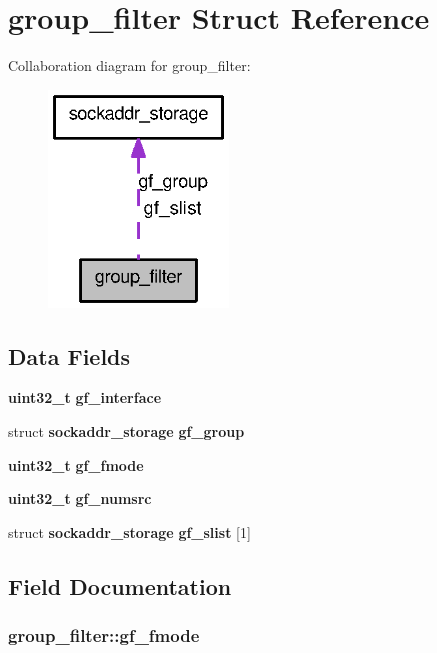 \section{group\_\-filter Struct Reference}
\label{structgroup__filter}


Collaboration diagram for group\_\-filter:
\nopagebreak
\begin{figure}[H]
\begin{center}
\leavevmode
\includegraphics[width=136pt]{structgroup__filter__coll__graph}
\end{center}
\end{figure}
\subsection*{Data Fields}
\begin{DoxyCompactItemize}
\item 
{\bf uint32\_\-t} {\bf gf\_\-interface}
\item 
struct {\bf sockaddr\_\-storage} {\bf gf\_\-group}
\item 
{\bf uint32\_\-t} {\bf gf\_\-fmode}
\item 
{\bf uint32\_\-t} {\bf gf\_\-numsrc}
\item 
struct {\bf sockaddr\_\-storage} {\bf gf\_\-slist} [1]
\end{DoxyCompactItemize}


\subsection{Field Documentation}
\subsubsection[{gf\_\-fmode}]{ {\bf group\_\-filter::gf\_\-fmode}}\label{structgroup__filter_a5792acae1105c5d22e4ebb030e6fe572}
